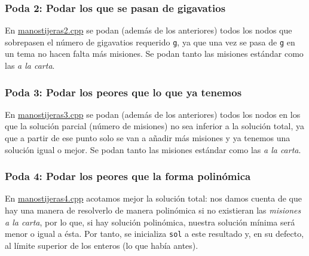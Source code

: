 \documentclass{article}
\begin{document}
	\subsubsection*{Poda 2: Podar los que se pasan de gigavatios}
	En \href{run:manostijeras2.cpp}{manostijeras2.cpp} se podan (además de los anteriores) todos los nodos que sobrepasen el número de gigavatios requerido \texttt{g}, ya que una vez se pasa de \texttt{g} en un tema no hacen falta más misiones. Se podan tanto las misiones estándar como las \textit{a la carta}.\\
	
	\subsubsection*{Poda 3: Podar los peores que lo que ya tenemos}
	En \href{run:manostijeras3.cpp}{manostijeras3.cpp} se podan (además de los anteriores) todos los nodos en los que la solución parcial (número de misiones) no sea inferior a la solución total, ya que a partir de ese punto solo se van a añadir más misiones y ya tenemos una solución igual o mejor. Se podan tanto las misiones estándar como las \textit{a la carta}.\\
	
	\subsubsection*{Poda 4: Podar los peores que la forma polinómica}
	En \href{run:manostijeras4.cpp}{manostijeras4.cpp} acotamos mejor la solución total: nos damos cuenta de que hay una manera de resolverlo de manera polinómica si no existieran las \textit{misiones a la carta}, por lo que, si hay solución polinómica, nuestra solución mínima será menor o igual a ésta. Por tanto, se inicializa \texttt{sol} a este resultado y, en su defecto, al límite superior de los enteros (lo que había antes).
	    
\end{document}
